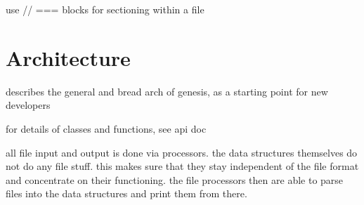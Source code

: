 \documentclass[a4paper,10pt]{article}
\begin{document}
use // === blocks for sectioning within a file

\section{Architecture}
\label{sec:Architecture}

describes the general and bread arch of genesis, as a starting point for new
developers

for details of classes and functions, see api doc

all file input and output is done via processors. the data structures themselves do not do any file
stuff. this makes sure that they stay independent of the file format and concentrate on their functioning.
the file processors then are able to parse files into the data structures and print them from there.
\end{document}
